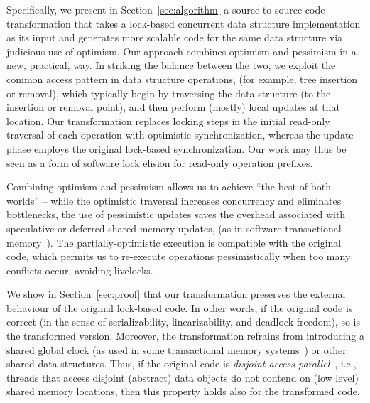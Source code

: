 Specifically, we present in Section~\ref{sec:algorithm} a source-to-source
code transformation that takes a lock-based concurrent data structure implementation as its input
and generates more scalable code for the same data structure via judicious use of optimism.
Our approach combines optimism and pessimism in a new, practical, way.
In striking the balance between the two, we exploit the common access pattern in data structure operations,
(for example, tree insertion or removal), which typically begin by traversing the data structure (to the insertion or removal point), and then perform (mostly) local updates at that location.
Our transformation replaces locking steps in the initial read-only traversal of each operation with
optimistic synchronization, whereas the update phase employs the original lock-based synchronization.
Our work may thus be seen as a form of software lock elision for read-only operation prefixes.

Combining optimism and pessimism allows us to achieve ``the best of both worlds'' -- while the
optimistic traversal increases concurrency and eliminates bottlenecks,
the use of pessimistic updates saves the overhead associated with speculative or deferred shared
memory updates, (as in software transactional memory~\cite{HLR:SLCA2010}).
The partially-optimistic execution is compatible with the original code, which permits us to re-execute operations
pessimistically when too many conflicts occur, avoiding livelocks.

We show in Section~\ref{sec:proof} that our transformation preserves the external behaviour of the original lock-based code.
In other words, if the original code is correct (in the sense of serializability, linearizability, and deadlock-freedom), so is the
transformed version. Moreover, the transformation
refrains from introducing a shared global clock (as used in some transactional memory systems~\cite{DBLP:conf/eurosys/ShalevS06}) or other
shared data structures. Thus, if the original code is \emph{disjoint access parallel}~\cite{Israeli:1994:DIS:197917.198079}, i.e., threads
that access disjoint (abstract) data objects do not contend on (low level) shared memory locations, then this
property holds also for the transformed code.

